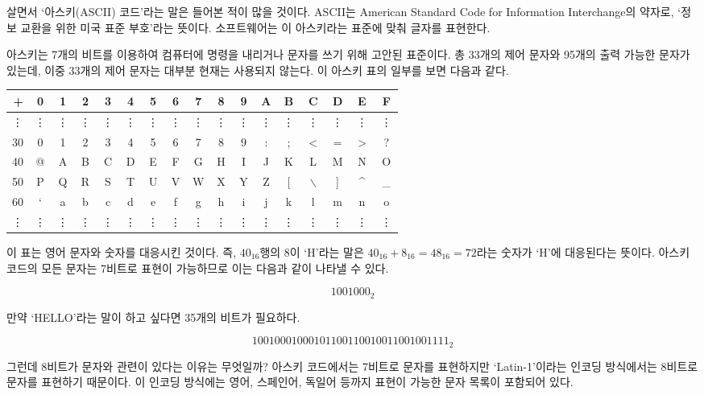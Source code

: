 \documentclass{article}
\begin{document}
살면서 `아스키(ASCII) 코드'라는 말은 들어본 적이 많을 것이다. ASCII는 American Standard
Code for Information Interchange의 약자로, `정보 교환을 위한 미국 표준 부호'라는 뜻이다.
소프트웨어는 이 아스키라는 표준에 맞춰 글자를 표현한다.

아스키는 7개의 비트를 이용하여 컴퓨터에 명령을 내리거나 문자를 쓰기 위해 고안된 표준이다.
총 33개의 제어 문자와 95개의 출력 가능한 문자가 있는데, 이중 33개의 제어 문자는 대부분 현재는
사용되지 않는다. 이 아스키 표의 일부를 보면 다음과 같다.

\begin{center}
    \begin{tabular}{r|cccccccccccccccc}
        + & 0 & 1 & 2 & 3 & 4 & 5 & 6 & 7 & 8 & 9 & A & B & C & D & E & F \\
        \hline
        \vdots & \vdots & \vdots & \vdots & \vdots & \vdots & \vdots & \vdots & \vdots & \vdots & \vdots & \vdots & \vdots & \vdots & \vdots & \vdots & \vdots \\
        30 & 0 & 1 & 2 & 3 & 4 & 5 & 6 & 7 & 8 & 9 & : & ; & $<$ & = & $>$ & ? \\
        40 & @ & A & B & C & D & E & F & G & H & I & J & K & L & M & N & O \\
        50 & P & Q & R & S & T & U & V & W & X & Y & Z & [ & $\backslash$ & ] & \^{} & \_{} \\
        60 & ` & a & b & c & d & e & f & g & h & i & j & k & l & m & n & o \\
        \vdots & \vdots & \vdots & \vdots & \vdots & \vdots & \vdots & \vdots & \vdots & \vdots & \vdots & \vdots & \vdots & \vdots & \vdots & \vdots & \vdots
    \end{tabular}
\end{center}

이 표는 영어 문자와 숫자를 대응시킨 것이다. 즉, $40_{16}$행의 8이 `H'라는 말은
$40_{16}+8_{16} = 48_{16} = 72$라는
숫자가 `H'에 대응된다는 뜻이다. 아스키 코드의 모든 문자는 7비트로 표현이 가능하므로 이는 다음과
같이 나타낼 수 있다.

$$
1001000_2
$$

만약 `HELLO'라는 말이 하고 싶다면 35개의 비트가 필요하다.

$$
1001000 1000101 1001100 1001100 1001111 _2
$$

그런데 8비트가 문자와 관련이 있다는 이유는 무엇일까?
아스키 코드에서는 7비트로 문자를 표현하지만 `Latin-1'이라는 인코딩 방식에서는 8비트로 문자를
표현하기 때문이다. 이 인코딩 방식에는 영어, 스페인어, 독일어 등까지 표현이 가능한 문자 목록이
포함되어 있다.
\end{document}
